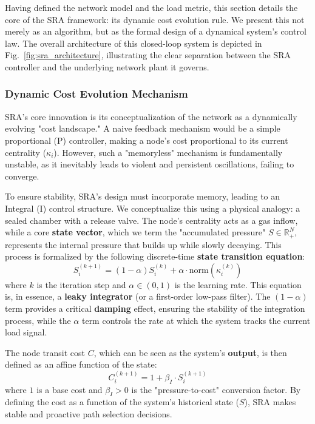 \documentclass[journal]{IEEEtran}
\begin{document}
Having defined the network model and the load metric, this section details the core of the SRA framework: its dynamic cost evolution rule. We present this not merely as an algorithm, but as the formal design of a dynamical system's control law. The overall architecture of this closed-loop system is depicted in Fig.~\ref{fig:sra_architecture}, illustrating the clear separation between the SRA controller and the underlying network plant it governs.

\subsubsection{Dynamic Cost Evolution Mechanism}
SRA's core innovation is its conceptualization of the network as a dynamically evolving "cost landscape." A naive feedback mechanism would be a simple proportional (P) controller, making a node's cost proportional to its current centrality ($\kappa_i$). However, such a "memoryless" mechanism is fundamentally unstable, as it inevitably leads to violent and persistent oscillations, failing to converge.

To ensure stability, SRA's design must incorporate memory, leading to an Integral (I) control structure. We conceptualize this using a physical analogy: a sealed chamber with a release valve. The node's centrality acts as a gas inflow, while a core \textbf{state vector}, which we term the "accumulated pressure" $S \in \mathbb{R}^N_+$, represents the internal pressure that builds up while slowly decaying. This process is formalized by the following discrete-time \textbf{state transition equation}:
\begin{equation}
    \label{eq:pressure_update}
    S_i^{(k+1)} = (1 - \alpha) S_i^{(k)} + \alpha \cdot \mathrm{norm}(\kappa_i^{(k)})
\end{equation}
where $k$ is the iteration step and $\alpha \in (0,1)$ is the learning rate. This equation is, in essence, a \textbf{leaky integrator} (or a first-order low-pass filter). The $(1-\alpha)$ term provides a critical \textbf{damping} effect, ensuring the stability of the integration process, while the $\alpha$ term controls the rate at which the system tracks the current load signal.

The node transit cost $C$, which can be seen as the system's \textbf{output}, is then defined as an affine function of the state:
\begin{equation}
    \label{eq:cost_update}
    C_i^{(k+1)} = 1 + \beta_I \cdot S_i^{(k+1)}
\end{equation}
where $1$ is a base cost and $\beta_I > 0$ is the "pressure-to-cost" conversion factor. By defining the cost as a function of the system's historical state ($S$), SRA makes stable and proactive path selection decisions.
\end{document}
